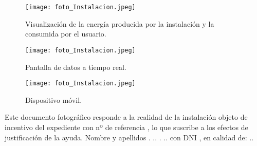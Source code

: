 \documentclass{article}
\begin{document}
\begin{figure}[h]
    \caption{Visualización de la energía producida por la
    instalación y la consumida por el usuario.}
    \centering
    \texttt{[image: foto\_Instalacion.jpeg]}
\end{figure}

\begin{figure}[h]
    \caption{Pantalla de datos a tiempo real.}
    \centering
    \texttt{[image: foto\_Instalacion.jpeg]}
\end{figure}

\begin{figure}[h]
    \caption{Dispositivo móvil.}
    \centering
    \texttt{[image: foto\_Instalacion.jpeg]}
\end{figure}
Este documento fotográfico responde a la realidad de la instalación objeto de incentivo del expediente con
nº de referencia                  , lo que suscribe a los efectos de justificación de la ayuda.
Nombre y apellidos                                                                                                      .                                                ..                                    .            .. con
DNI                                    , en calidad de:                                                                                                                                                            ..
\end{document}

